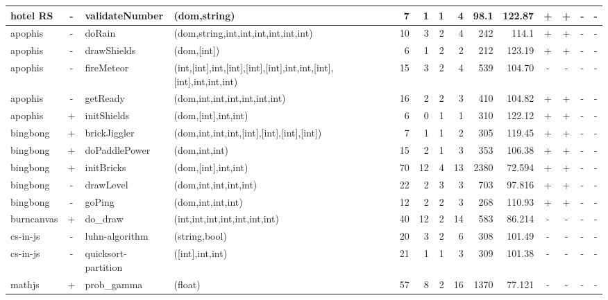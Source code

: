 \documentclass[sigconf]{acmart}
\begin{document}
\begin{table*}[t]
\begin{tabular}{l|c|l|l|r|r|r|r|r|r|c|c|c|c}
    hotel RS   & - & validateNumber & (dom,string)  & 7  & 1 & 1 & 4 & 98.1 & 122.87 & + & + & - & - \\
    \hline
    apophis    & - & doRain & (dom,string,int,int,int,int,int,int)                                  & 10 & 3 & 2 & 4 & 242 & 114.1  & + & + & - & -\\
    apophis    & - & drawShields & (dom,[int])                                                      & 6  & 1 & 2 & 2 & 212 & 123.19 & + & + & - & - \\
    apophis    & - & fireMeteor & (int,[int],int,[int],[int],[int],int,int,[int],[int],int,int,int) & 15 & 3 & 2 & 4 & 539 & 104.70 & - & - & - & - \\
    apophis    & - & getReady & (dom,int,int,int,int,int,int)                                       & 16 & 2 & 2 & 3 & 410 & 104.82 & + & + & - & - \\
    apophis    & + & initShields & (dom,[int],int,int)                                               & 6  & 0 & 1 & 1 & 310 & 122.12 & + & + & - & -\\
    \hline
    bingbong   & + & brickJiggler & (dom,int,int,int,[int],[int],[int],[int]) & 7  & 1  & 1 & 2  & 305  & 119.45 & + & + & - & - \\
    bingbong   & + & doPaddlePower & (dom,int,int)                            & 15 & 2  & 1 & 3  & 353  & 106.38 & + & + & - & - \\
    bingbong   & + & initBricks & (dom,[int],int,int)                         & 70 & 12 & 4 & 13 & 2380 & 72.594 & + & + & - & - \\
    bingbong   & - & drawLevel & (dom,int,int,int,int)                       & 22 & 2  & 3 & 3  & 703  & 97.816 & + & + & - & - \\
    bingbong   & - & goPing & (dom,int,int,int)                              & 12 & 2  & 2 & 3  & 268  & 110.93 & + & + & - & - \\
    \hline
    burncanvas & + & do\_draw & (int,int,int,int,int,int,int)                 & 40 & 12 & 2 & 14 & 583 & 86.214 & - & - & - & - \\
    \hline
    cs-in-js   & - & luhn-algorithm & (string,bool)                          & 20 & 3 & 2 & 6 & 308 & 101.49 & -  & -  & - & - \\
    cs-in-js   & - & quicksort-partition & ([int],int,int)                   & 21 & 1 & 1 & 3 & 309 & 101.38 & -  & -  & - & - \\ 
    \hline
    mathjs     & + & prob\_gamma & (float)                                    & 57 & 8  & 2 & 16 & 1370 & 77.121 & - & - & - & - \\
    \bottomrule
  \end{tabular}
\end{table*}
\end{document}
